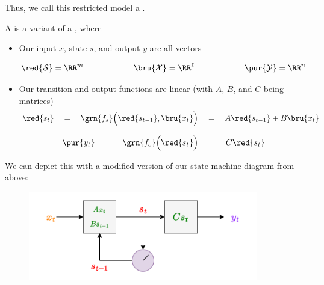         Thus, we call this restricted model a .\\

        \begin{definition}
            A  is a variant of a , where

            \begin{itemize}
                \item Our input $x$, state $s$, and output $y$ are all vectors

                \begin{equation*}
                    \red{\mathcal{S}} = \RR^m    \qquad\qquad\qquad
                    \bru{\mathcal{X}} = \RR^\ell \qquad\qquad\qquad
                    \pur{\mathcal{Y}} = \RR^n
                \end{equation*} 
                
                \item Our transition and output functions are linear (with $A$, $B$, and $C$ being matrices)
                    \begin{equation*}
                        \red{s_t} 
                        \quad=\quad 
                        \grn{f_s}\Big(\red{s_{t-1}},\bru{x_t}\Big) 
                        \quad=\quad 
                        A\red{s_{t-1}} + B\bru{x_t}
                    \end{equation*}

                    \begin{equation*}
                        \pur{y_t} 
                        \quad=\quad \grn{f_o}\Big(\red{s_t}\Big) 
                        \quad=\quad C\red{s_t}
                    \end{equation*}
            \end{itemize}
        \end{definition}

        We can depict this with a modified version of our state machine diagram from above:

        \begin{figure}[H]
            \centering
            \includegraphics[width=100mm,scale=0.4]{images/rnn_images/lti_diagram.png}
        \end{figure}

